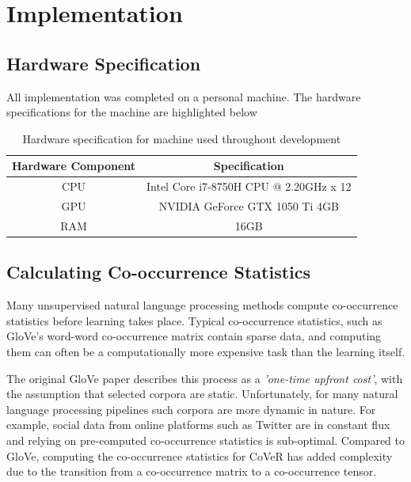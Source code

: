 \chapter{Implementation}
\label{chap:implementation}
\section{Hardware Specification}
All implementation was completed on a personal machine. The hardware specifications for the machine are highlighted below

\begin{table}[h!]
	\centering
	\begin{tabular}{||c | c||} 
		\hline
		Hardware Component & Specification \\ [0.5ex] 
		\hline\hline
		CPU & Intel Core i7-8750H CPU @ 2.20GHz x 12 \\ 
		GPU & NVIDIA GeForce GTX 1050 Ti 4GB \\
		RAM & 16GB \\
		\hline
	\end{tabular}
	\caption{Hardware specification for machine used throughout development}
	\label{table:1}
\end{table}
\section{Calculating Co-occurrence Statistics}
Many unsupervised natural language processing methods compute co-occurrence statistics before learning takes place. Typical co-occurrence statistics, such as GloVe's word-word co-occurrence matrix contain sparse data, and computing them can often be a computationally more expensive task than the learning itself. 

\noindent
\newline
The original GloVe paper describes this process as a \textit{'one-time upfront cost'}, with the assumption that selected corpora are static. Unfortunately, for many natural language processing pipelines such corpora are more dynamic in nature. For example, social data from online platforms such as Twitter are in constant flux and relying on pre-computed co-occurrence statistics is sub-optimal. Compared to GloVe, computing the co-occurrence statistics for CoVeR has added complexity due to the transition from a co-occurrence matrix to a co-occurrence tensor. 

